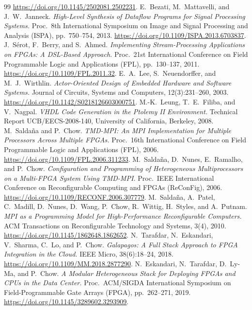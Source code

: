 \documentclass[11pt]{article}
\begin{document}
\begin{thebibliography}{99}
  \url{https://doi.org/10.1145/2502081.2502231}.
 E.~Bezati, M.~Mattavelli, and J.~W.~Janneck.
  \emph{High-Level Synthesis of Dataflow Programs for Signal Processing
  Systems.} Proc.\ 8th International Symposium on Image and Signal Processing
  and Analysis (ISPA), pp.~750--754, 2013.
  \url{https://doi.org/10.1109/ISPA.2013.6703837}.
 J.~S\'erot, F.~Berry, and S.~Ahmed.
  \emph{Implementing Stream-Processing Applications on FPGAs: A DSL-Based
  Approach.} Proc.\ 21st International Conference on Field Programmable Logic
  and Applications (FPL), pp.~130--137, 2011.
  \url{https://doi.org/10.1109/FPL.2011.32}.
 E.~A.~Lee, S.~Neuendorffer, and M.~J.~Wirthlin.
  \emph{Actor-Oriented Design of Embedded Hardware and Software Systems.}
  Journal of Circuits, Systems and Computers, 12(3):231--260, 2003.
  \url{https://doi.org/10.1142/S0218126603000751}.
 M.-K.~Leung, T.~E.~Filiba, and V.~Nagpal.
  \emph{VHDL Code Generation in the Ptolemy II Environment.} Technical Report
  UCB/EECS-2008-140, University of California, Berkeley, 2008.
 M.~Salda\~na and P.~Chow. \emph{TMD-MPI: An MPI
  Implementation for Multiple Processors Across Multiple FPGAs.} Proc.\ 16th
  International Conference on Field Programmable Logic and Applications (FPL),
  2006. \url{https://doi.org/10.1109/FPL.2006.311233}.
 M.~Salda\~na, D.~Nunes, E.~Ramalho, and P.~Chow.
  \emph{Configuration and Programming of Heterogeneous Multiprocessors on a
  Multi-FPGA System Using TMD-MPI.} Proc.\ IEEE International Conference on
  Reconfigurable Computing and FPGAs (ReConFig), 2006.
  \url{https://doi.org/10.1109/RECONF.2006.307779}.
 M.~Salda\~na, A.~Patel, C.~Madill, D.~Nunes, D.~Wang,
  P.~Chow, R.~Wittig, H.~Styles, and A.~Putnam. \emph{MPI as a Programming
  Model for High-Performance Reconfigurable Computers.} ACM Transactions on
  Reconfigurable Technology and Systems, 3(4), 2010.
  \url{https://doi.org/10.1145/1862648.1862652}.
 N.~Tarafdar, N.~Eskandari, V.~Sharma, C.~Lo, and
  P.~Chow. \emph{Galapagos: A Full Stack Approach to FPGA Integration in the
  Cloud.} IEEE Micro, 38(6):18--24, 2018.
  \url{https://doi.org/10.1109/MM.2018.2877290}.
 N.~Eskandari, N.~Tarafdar, D.~Ly-Ma, and P.~Chow.
  \emph{A Modular Heterogeneous Stack for Deploying FPGAs and CPUs in the Data
  Center.} Proc.\ ACM/SIGDA International Symposium on Field-Programmable Gate
  Arrays (FPGA), pp.~262--271, 2019.
  \url{https://doi.org/10.1145/3289602.3293909}.

\end{thebibliography}
\end{document}

